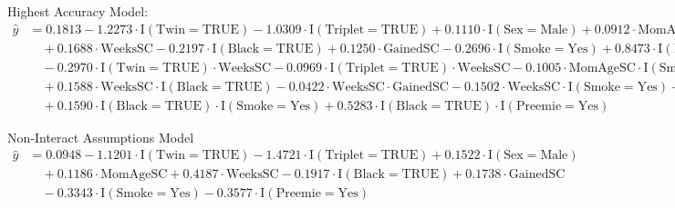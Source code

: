 \documentclass{article}\usepackage[]{graphicx}\usepackage[]{xcolor}
\begin{document}
Highest Accuracy Model:
\begin{align*}
\hat{y} &= 0.1813 - 1.2273\cdot \text{I}(\text{Twin} = \text{TRUE}) - 1.0309\cdot \text{I}(\text{Triplet} = \text{TRUE}) + 0.1110\cdot \text{I}(\text{Sex} = \text{Male}) + 0.0912\cdot \text{MomAgeSC} \\
&\quad + 0.1688\cdot \text{WeeksSC} - 0.2197\cdot \text{I}(\text{Black} = \text{TRUE}) + 0.1250\cdot \text{GainedSC} - 0.2696\cdot \text{I}(\text{Smoke} = \text{Yes}) + 0.8473\cdot \text{I}(\text{Preemie} = \text{Yes}) \\
&\quad - 0.2970\cdot \text{I}(\text{Twin} = \text{TRUE})\cdot \text{WeeksSC} - 0.0969\cdot \text{I}(\text{Triplet} = \text{TRUE})\cdot \text{WeeksSC} - 0.1005\cdot \text{MomAgeSC}\cdot \text{I}(\text{Smoke} = \text{Yes}) \\ &\quad + 0.1588\cdot \text{WeeksSC}\cdot \text{I}(\text{Black} = \text{TRUE}) - 0.0422\cdot \text{WeeksSC}\cdot \text{GainedSC} - 0.1502\cdot \text{WeeksSC}\cdot \text{I}(\text{Smoke} = \text{Yes}) + 1.1080\cdot \text{WeeksSC}\cdot \text{I}(\text{Preemie} = \text{Yes}) \\
&\quad + 0.1590\cdot \text{I}(\text{Black} = \text{TRUE})\cdot \text{I}(\text{Smoke} = \text{Yes}) + 0.5283\cdot \text{I}(\text{Black} = \text{TRUE})\cdot \text{I}(\text{Preemie} = \text{Yes})
\end{align*}

Non-Interact Assumptions Model
\begin{align*}
\hat{y} &= 0.0948 - 1.1201\cdot \text{I}(\text{Twin} = \text{TRUE}) - 1.4721\cdot \text{I}(\text{Triplet} = \text{TRUE}) + 0.1522\cdot \text{I}(\text{Sex} = \text{Male}) \\
&\quad + 0.1186\cdot \text{MomAgeSC} + 0.4187\cdot \text{WeeksSC} - 0.1917\cdot \text{I}(\text{Black} = \text{TRUE}) + 0.1738\cdot \text{GainedSC} \\
&\quad - 0.3343\cdot \text{I}(\text{Smoke} = \text{Yes}) - 0.3577\cdot \text{I}(\text{Preemie} = \text{Yes})
\end{align*}
\end{document}
